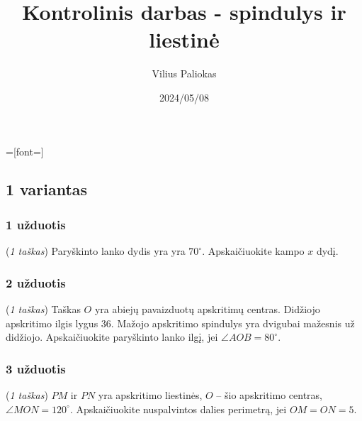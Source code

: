 \documentclass[a4paper]{article}
\title{Kontrolinis darbas - spindulys ir liestinė}
\author{Vilius Paliokas}
\date{2024/05/08}
\begin{document}
\newcommand\blankpage{%
      \null
      \thispagestyle{empty}%
      \addtocounter{page}{-1}%
      \newpage
}

\thispagestyle{fancy}

=[font=\LARGE]

\subsection*{1 variantas}
\vspace*{5mm}

\subsubsection*{1 užduotis}
\begin{minipage}[t]{0.22\textwidth}
      \centering
\end{minipage}\hfill
\begin{minipage}{0.69\textwidth}

      (\textit{1 taškas}) Paryškinto lanko dydis yra yra $70^\circ$.
      Apskaičiuokite kampo $x$
      dydį.
\end{minipage}

\subsubsection*{2 užduotis}

\begin{minipage}[t]{0.22\textwidth}
      \centering
\end{minipage}\hfill
\begin{minipage}{0.69\textwidth}
      (\textit{1 taškas}) Taškas $O$ yra abiejų pavaizduotų apskritimų centras. Didžiojo
      apskritimo ilgis lygus $36$. Mažojo apskritimo spindulys yra
      dvigubai mažesnis už didžiojo. Apskaičiuokite paryškinto
      lanko ilgį, jei $\angle AOB = 80^\circ$.
\end{minipage}

\subsubsection*{3 užduotis}

\begin{minipage}[t]{0.28\textwidth}
      \centering
\end{minipage}\hfill
\begin{minipage}{0.69\textwidth}
      (\textit{1 taškas}) $PM$ ir $PN$ yra apskritimo liestinės, $O$ – šio 		
      apskritimo centras, $\angle MON = 120^\circ$. 
      Apskaičiuokite nuspalvintos dalies perimetrą, 
      jei $OM = ON = 5$.
\end{minipage}
\end{document}
